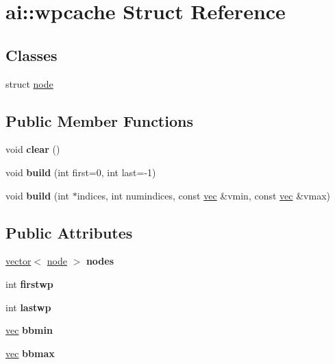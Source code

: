 \hypertarget{structai_1_1wpcache}{}\section{ai\+:\+:wpcache Struct Reference}
\label{structai_1_1wpcache}
\subsection*{Classes}
\begin{DoxyCompactItemize}
\item 
struct \hyperlink{structai_1_1wpcache_1_1node}{node}
\end{DoxyCompactItemize}
\subsection*{Public Member Functions}
\begin{DoxyCompactItemize}
\item 
\mbox{\label{structai_1_1wpcache_a0bac7988d7b1468e782b732b76604172}} 
void {\bfseries clear} ()
\item 
\mbox{\label{structai_1_1wpcache_aa16b7fac619f57ce8cb2dfb2a7a41e01}} 
void {\bfseries build} (int first=0, int last=-\/1)
\item 
\mbox{\label{structai_1_1wpcache_a9d95a37b617382c6029893207420ce33}} 
void {\bfseries build} (int $\ast$indices, int numindices, const \hyperlink{structvec}{vec} \&vmin, const \hyperlink{structvec}{vec} \&vmax)
\end{DoxyCompactItemize}
\subsection*{Public Attributes}
\begin{DoxyCompactItemize}
\item 
\mbox{\label{structai_1_1wpcache_a9ba3f67e35c437028361515ddecbec83}} 
\hyperlink{structvector}{vector}$<$ \hyperlink{structai_1_1wpcache_1_1node}{node} $>$ {\bfseries nodes}
\item 
\mbox{\label{structai_1_1wpcache_af1ebfe02b39ea0c6c103542ba411bde0}} 
int {\bfseries firstwp}
\item 
\mbox{\label{structai_1_1wpcache_af046c2e7cf87ea578eeaee65a71b0514}} 
int {\bfseries lastwp}
\item 
\mbox{\label{structai_1_1wpcache_afd32ca0390a3702735ba1e667d87e44d}} 
\hyperlink{structvec}{vec} {\bfseries bbmin}
\item 
\mbox{\label{structai_1_1wpcache_a9209d6ec6f5ecd437d8f643063c969e9}} 
\hyperlink{structvec}{vec} {\bfseries bbmax}
\end{DoxyCompactItemize}


